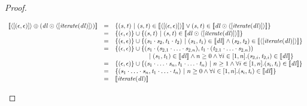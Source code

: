 \documentclass[numbers]{sigplanconf}
\begin{document}
\begin{proof}
\begin{description}
    \[
      \begin{array}{rcl}
        \SemanticsOf{\DNFLensOf{\SequenceLensOf{(\EmptyString,\EmptyString)}}
        \OrDNFLens
        (\DNFLens \ConcatDNFLens
        \DNFLensOf{\SequenceLensOf{\IterateLensOf{\DNFLens}}})}
        & = & \SetOf{(\String,\StringAlt)\SuchThat
              (\String,\StringAlt)\in\SemanticsOf{\DNFLensOf{\SequenceLensOf{
              (\EmptyString,\EmptyString)}}} \BooleanOr (\String,\StringAlt)
              \in \SemanticsOf{\DNFLens \ConcatDNFLens
              \DNFLensOf{\SequenceLensOf{\IterateLensOf{\DNFLens}}}}}\\
        & = & \SetOf{(\EmptyString,\EmptyString)} \Union
              \SetOf{(\String,\StringAlt) \SuchThat (\String,\StringAlt) \in
              \SemanticsOf{\DNFLens \ConcatDNFLens
              \DNFLensOf{\SequenceLensOf{\IterateLensOf{\DNFLens}}}}}\\
        & = & \SetOf{(\EmptyString,\EmptyString)} \Union
              \SetOf{(\String_1\Concat\String_2,\StringAlt_1\Concat\StringAlt_2)
              \SuchThat (\String_1,\StringAlt_1) \in
              \SemanticsOf{\DNFLens} \BooleanAnd
              (\String_2,\StringAlt_2) \in
              \SemanticsOf{\DNFLensOf{\SequenceLensOf{\IterateLensOf{\DNFLens}}}}}\\
        & = & \SetOf{(\EmptyString,\EmptyString)} \Union
              \SetOf{(\String_1\Concat
              (\String_{2,1}\Concat\ldots\Concat\String_{2,n}),
              \StringAlt_1\Concat
              (\StringAlt_{2,1}\Concat\ldots\Concat\String_{2,n}))\\
        & & \hspace*{5em}
            \SuchThat (\String_1,\StringAlt_1) \in
            \SemanticsOf{\DNFLens} \BooleanAnd n\geq 0 \BooleanAnd
            \forall i\in\RangeIncInc{1}{n}.(\String_{2,i},\StringAlt_{2,i}) \in
            \SemanticsOf{\DNFLens}}\\
        & = & \SetOf{(\EmptyString,\EmptyString)} \Union
              \SetOf{(\String_1\Concat\ldots\Concat\String_n,
              \StringAlt_1\Concat\ldots\Concat\StringAlt_n) \SuchThat
              n \geq 1 \BooleanAnd \forall i\in\RangeIncInc{1}{n}.
              (\String_i,\StringAlt_i)\in\SemanticsOf{\DNFLens}}\\
        & = & \SetOf{(\String_1\Concat\ldots\Concat\String_n,
              \StringAlt_1\Concat\ldots\Concat\StringAlt_n) \SuchThat
              n \geq 0 \BooleanAnd \forall i\in\RangeIncInc{1}{n}.
              (\String_i,\StringAlt_i)\in\SemanticsOf{\DNFLens}}\\
        & = & \SemanticsOf{\IterateLensOf{\DNFLens}}
      \end{array}
    \]
    

\end{description}
\end{proof}
\end{document}
